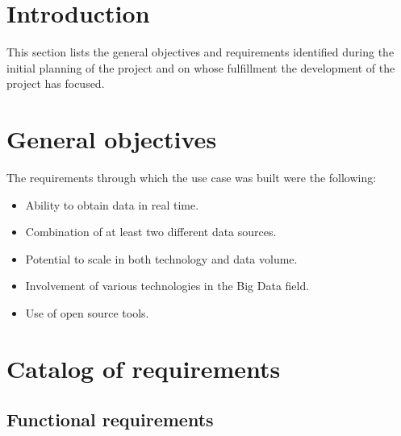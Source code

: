  \label{requirements}

\section{Introduction}

\nonzeroparskip This section lists the general objectives and requirements identified during the initial planning of the project and on whose fulfillment the development of the project has focused.

\section{General objectives}

\nonzeroparskip The requirements through which the use case was built were the following:
\begin{itemize}
	\item Ability to obtain data in real time.
	\item Combination of at least two different data sources.
	\item Potential to scale in both technology and data volume.
	\item Involvement of various technologies in the Big Data field.
	\item Use of open source tools.
\end{itemize}

\section{Catalog of requirements}

\subsection{Functional requirements}

